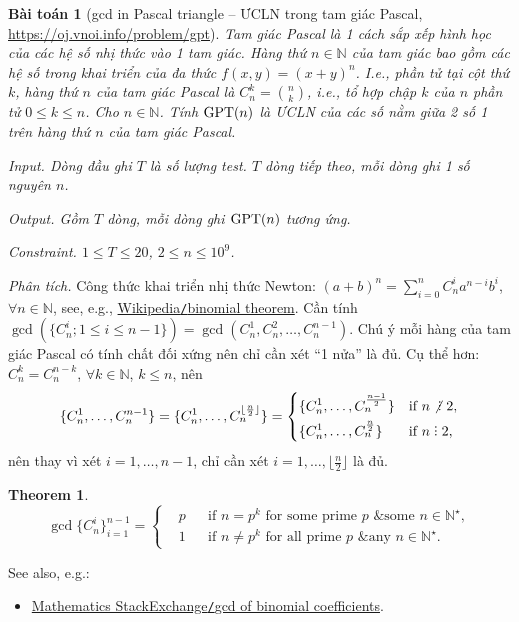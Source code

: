 \documentclass{article}
\newtheorem{baitoan}{Bài toán}
\newtheorem{theorem}{Theorem}
\DeclareRobustCommand{\divby}{%
	\mathrel{\vbox{\baselineskip.65ex\lineskiplimit0pt\hbox{.}\hbox{.}\hbox{.}}}%
}
\begin{document}
\begin{baitoan}[gcd in Pascal triangle -- ƯCLN trong tam giác Pascal, \url{https://oj.vnoi.info/problem/gpt}]
	Tam giác Pascal là 1 cách sắp xếp hình học của các hệ số nhị thức vào 1 tam giác. Hàng thứ $n\in\mathbb{N}$ của tam giác bao gồm các hệ số trong khai triển của đa thức $f(x,y) = (x + y)^n$. I.e., phần tử tại cột thứ $k$, hàng thứ $n$ của tam giác Pascal là $C_n^k = \binom{n}{k}$, i.e., tổ hợp chập $k$ của $n$ phần tử $0\le k\le n$. Cho $n\in\mathbb{N}$. Tính ${\rm GPT}(n)$ là ƯCLN của các số nằm giữa 2 số 1 trên hàng thứ $n$ của tam giác Pascal.
	\item {\sf Input.} Dòng đầu ghi $T$ là số lượng test. $T$ dòng tiếp theo, mỗi dòng ghi 1 số nguyên $n$.
	\item {\sf Output.} Gồm $T$ dòng, mỗi dòng ghi ${\rm GPT}(n)$ tương ứng.
	\item {\sf Constraint.} $1\le T\le20$, $2\le n\le10^9$.
\end{baitoan}
{\it Phân tích.} Công thức khai triển nhị thức Newton: $(a + b)^n = \sum_{i=0}^n C_n^ia^{n-i}b^i$, $\forall n\in\mathbb{N}$, see, e.g., \href{https://en.wikipedia.org/wiki/Binomial_theorem}{Wikipedia{\tt/}binomial theorem}. Cần tính $\gcd(\{C_n^i;1\le i\le n - 1\}) = \gcd(C_n^1,C_n^2,\ldots,C_n^{n-1})$. Chú ý mỗi hàng của tam giác Pascal có tính chất đối xứng nên chỉ cần xét ``1 nửa'' là đủ. Cụ thể hơn: $C_n^k = C_n^{n-k}$, $\forall k\in\mathbb{N}$, $k\le n$, nên
\begin{equation*}
	\{C_n^1,\ldots,C_n^{n-1}\} = \{C_n^1,\ldots,C_n^{\lfloor\frac{n}{2}\rfloor}\} = \left\{\begin{split}
		&\{C_n^1,\ldots,C_n^{\frac{n-1}{2}}\}&&\mbox{if } n\not{\divby}\ 2,\\
		&\{C_n^1,\ldots,C_n^{\frac{n}{2}}\}&&\mbox{if } n\divby2,
	\end{split}\right.
\end{equation*}
nên thay vì xét $i = 1,\ldots,n-1$, chỉ cần xét $i = 1,\ldots,\lfloor\frac{n}{2}\rfloor$ là đủ.

\begin{theorem}
	\begin{equation*}
		\gcd\{C_n^i\}_{i=1}^{n-1} = \left\{\begin{split}
			&p&&\mbox{if } n = p^k\mbox{ for some prime } p\mbox{ \& some } n\in\mathbb{N}^\star,\\
			&1&&\mbox{if } n\ne p^k\mbox{ for all prime } p\mbox{ \& any } n\in\mathbb{N}^\star.
		\end{split}\right.
	\end{equation*}
\end{theorem}
See also, e.g.:
\begin{itemize}
	\item \href{https://math.stackexchange.com/questions/2067235/gcd-of-binomial-coefficients}{Mathematics StackExchange{\tt/}gcd of binomial coefficients}.
\end{itemize}
\end{document}
